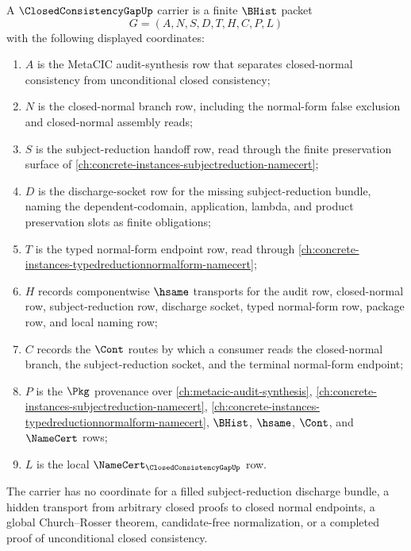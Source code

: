 \begin{definition}
\label{def:closed-consistency-gap-carrier}
A $\ClosedConsistencyGapUp$ carrier is a finite $\BHist$ packet
$$
G=(A,N,S,D,T,H,C,P,L)
$$
with the following displayed coordinates:
\begin{enumerate}
\item $A$ is the MetaCIC audit-synthesis row that separates closed-normal consistency from unconditional closed consistency;
\item $N$ is the closed-normal branch row, including the normal-form false exclusion and closed-normal assembly reads;
\item $S$ is the subject-reduction handoff row, read through the finite preservation surface of \autoref{ch:concrete-instances-subjectreduction-namecert};
\item $D$ is the discharge-socket row for the missing subject-reduction bundle, naming the dependent-codomain, application, lambda, and product preservation slots as finite obligations;
\item $T$ is the typed normal-form endpoint row, read through \autoref{ch:concrete-instances-typedreductionnormalform-namecert};
\item $H$ records componentwise $\hsame$ transports for the audit row, closed-normal row, subject-reduction row, discharge socket, typed normal-form row, package row, and local naming row;
\item $C$ records the $\Cont$ routes by which a consumer reads the closed-normal branch, the subject-reduction socket, and the terminal normal-form endpoint;
\item $P$ is the $\Pkg$ provenance over \autoref{ch:metacic-audit-synthesis}, \autoref{ch:concrete-instances-subjectreduction-namecert}, \autoref{ch:concrete-instances-typedreductionnormalform-namecert}, $\BHist$, $\hsame$, $\Cont$, and $\NameCert$ rows;
\item $L$ is the local $\NameCert_{\ClosedConsistencyGapUp}$ row.
\end{enumerate}
The carrier has no coordinate for a filled subject-reduction discharge bundle, a hidden transport from arbitrary closed proofs to closed normal endpoints, a global Church--Rosser theorem, candidate-free normalization, or a completed proof of unconditional closed consistency.
\end{definition}

